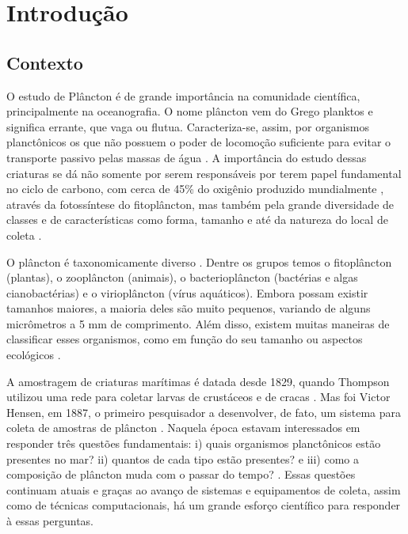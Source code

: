 \chapter{Introdução}
\label{cap:introducao}


\section{Contexto}
\label{sec:intro_contexto}



O estudo de Plâncton é de grande importância na comunidade científica, principalmente na oceanografia. O nome plâncton vem do Grego planktos e significa errante, que vaga ou flutua. Caracteriza-se, assim, por organismos planctônicos os que não possuem o poder de locomoção suficiente para evitar o transporte passivo pelas massas de água \citep{ciotti2015vida, calazans2011organismos}.  A importância do estudo dessas criaturas se dá não somente por serem responsáveis por terem papel fundamental no ciclo de carbono, com cerca de 45\% do oxigênio produzido mundialmente \citep{brierleyplankton},  através da fotossíntese do fitoplâncton, mas também pela grande diversidade de classes e de características como forma, tamanho e até da natureza do local de coleta \citep{calazans2011organismos}. 

O plâncton é taxonomicamente diverso \citep{brierleyplankton}. Dentre os grupos temos o fitoplâncton (plantas), o zooplâncton (animais), o bacterioplâncton (bactérias e algas cianobactérias) e o virioplâncton (vírus aquáticos). Embora possam existir tamanhos maiores, a maioria deles são muito pequenos, variando de alguns micrômetros a 5 mm de comprimento. Além disso, existem muitas maneiras de classificar esses organismos, como em função do seu tamanho ou aspectos ecológicos \citep{calazans2011organismos}.


A amostragem de criaturas marítimas é datada desde 1829, quando Thompson utilizou uma rede para coletar larvas de crustáceos e de cracas \citep{brierleyplankton}. Mas foi Victor Hensen, em 1887, o primeiro pesquisador a desenvolver, de fato, um sistema para coleta de amostras de plâncton \citep{benfield2007rapid, wiebe2003hensen, allen1919contribution}. Naquela época estavam interessados em responder três questões fundamentais: i) quais organismos planctônicos estão presentes no mar? ii) quantos de cada tipo estão presentes? e iii) como a composição de plâncton muda com o passar do tempo?  \citep{benfield2007rapid}. Essas questões continuam atuais e graças ao avanço de sistemas e equipamentos de coleta, assim como de técnicas computacionais, há um grande esforço científico para responder à essas perguntas.


